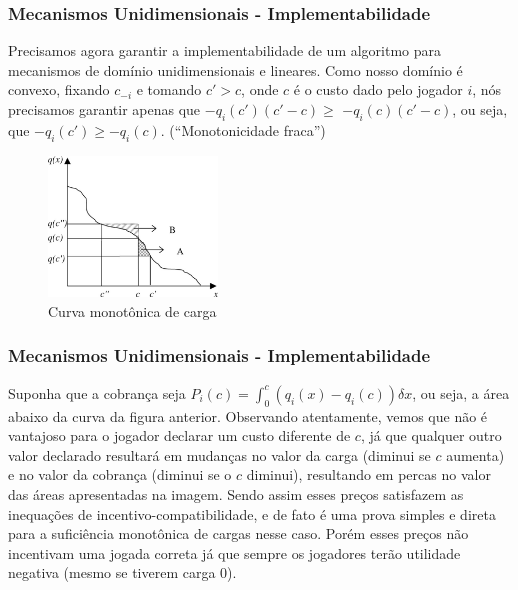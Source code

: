 \documentclass{beamer}
\begin{document}
\begin{frame}
    \frametitle{Mecanismos Unidimensionais - Implementabilidade}
    Precisamos agora garantir a implementabilidade de um algoritmo para mecanismos de domínio unidimensionais e lineares. Como nosso domínio é convexo, fixando $c_{-i}$ e tomando $c' > c$, onde $c$ é o custo dado pelo jogador $i$, nós precisamos garantir apenas que $-q_i(c')(c' - c) \geq$ $-q_i(c)(c' - c)$, ou seja, que $-q_i(c') \geq -q_i(c)$. (``Monotonicidade fraca'')
    
    \begin{figure}[H]
        \centering
        \includegraphics[width=0.4\textwidth]{image1.png}
        \\{Curva monotônica de carga}
    \end{figure} 
\end{frame}

\begin{frame}
    \frametitle{Mecanismos Unidimensionais - Implementabilidade}
    Suponha que a cobrança seja $P_i(c) = \int_{0}^{c} \left(q_i(x) - q_i(c) \right) \delta x$, ou seja, a área abaixo da curva da figura anterior. Observando atentamente, vemos que não é vantajoso para o jogador declarar um custo diferente de $c$, já que qualquer outro valor declarado resultará em mudanças no valor da carga (diminui se $c$ aumenta) e no valor da cobrança (diminui se o $c$ diminui), resultando em percas no valor das áreas apresentadas na imagem. Sendo assim esses preços satisfazem as inequações de incentivo-compatibilidade, e de fato é uma prova simples e direta para a suficiência monotônica de cargas nesse caso. Porém esses preços não incentivam uma jogada correta já que sempre os jogadores terão utilidade negativa (mesmo se tiverem carga 0).
\end{frame}
\end{document}

